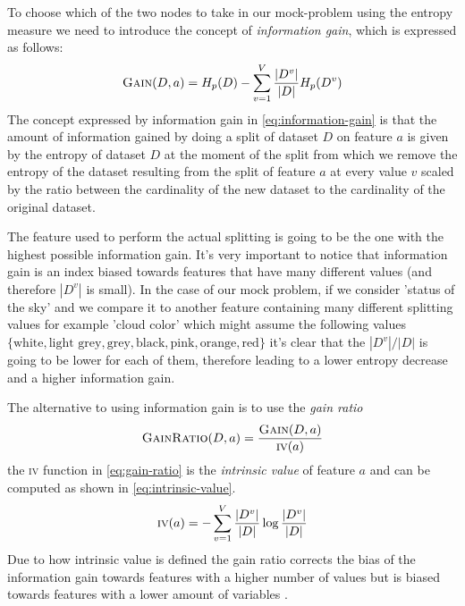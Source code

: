 \smallskip

To choose which of the two nodes to take in our mock-problem using the entropy measure we need to
introduce the concept of \emph{information gain}, which is expressed as follows:
\begin{equation}
	\label{eq:information-gain}
	\textsc{Gain}(D, a) = H_p(D) - \sum_{v = 1}^V\frac{|D^v|}{|D|}H_p(D^v)
\end{equation}
The concept expressed by information gain in \cref{eq:information-gain} is that the amount of
information gained by doing a split of dataset $D$ on feature $a$ is given by the entropy of dataset
$D$ at the moment of the split from which we remove the entropy of the dataset resulting from the
split of feature $a$ at every value $v$ scaled by the ratio between the cardinality of the new dataset to
the cardinality of the original dataset.

\smallskip

The feature used to perform the actual splitting is going to be the one with the highest possible
information gain. It's very important to notice that information gain is an index biased towards
features that have many different values (and therefore $|D^v|$ is small). In the case of our mock
problem, if we consider 'status of the sky' and we compare it to another feature containing many
different splitting values for example 'cloud color' which might assume the following values
$\{\text{white}, \text{light grey}, \text{grey}, \text{black}, \text{pink}, \text{orange},
	\text{red}\}$ it's clear that the $|D^v|/|D|$ is going to be lower for each of them, therefore
leading to a lower entropy decrease and a higher information gain.

\medskip

The alternative to using information gain is to use the \emph{gain ratio}
\begin{equation}
	\label{eq:gain-ratio}
	\textsc{GainRatio}(D, a) = \frac{\textsc{Gain}(D, a)}{\textsc{iv}(a)}
\end{equation}
the \textsc{iv} function in \cref{eq:gain-ratio} is the \emph{intrinsic value} of feature $a$ and
can be computed as shown in \cref{eq:intrinsic-value}.
\begin{equation}
	\label{eq:intrinsic-value}
	\textsc{iv}(a) = - \sum_{v = 1}^V\frac{|D^v|}{|D|} \log{\frac{|D^v|}{|D|}}
\end{equation}
Due to how intrinsic value is defined the gain ratio corrects the bias of the information gain towards features
with a higher number of values but is biased towards features with a lower amount of variables
\cite{ZhouZhi-Hua2021ML}.

